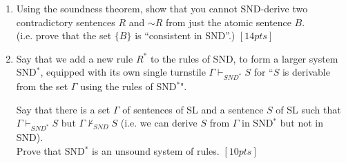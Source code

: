 \documentclass[12pt]{article}
\def\enot{\ensuremath{{\sim}}} %
\let\oldsim\sim %
\renewcommand{\sim}{{\oldsim}} %
\begin{document}
\begin{enumerate}



\item  Using the soundness theorem, show that you cannot SND-derive two contradictory sentences $R$ and $\enot R$ from just the atomic sentence $B$. \\ (i.e. prove that the set $\{B\}$ is ``consistent in SND''.) $[14pts]$ \\



\item Say that we add a new rule $R^*$ to the rules of SND, to form a larger system SND$^*$, equipped with its own single turnstile $\Gamma \vdash_{SND^*} S$  for ``$S$ is derivable from the set $\Gamma$ using the rules of SND$^*$". 



Say that there is a set $\Gamma$ of sentences of SL and a sentence $S$ of SL such that $\Gamma \vdash_{SND^*} S$ but $\Gamma \nvdash_{SND} S$ (i.e. we can derive $S$ from $\Gamma$ in SND$^*$ but not in SND). \\ %

Prove that SND$^*$ is an unsound system of rules. $[10pts]$ 






\end{enumerate}
\end{document}
